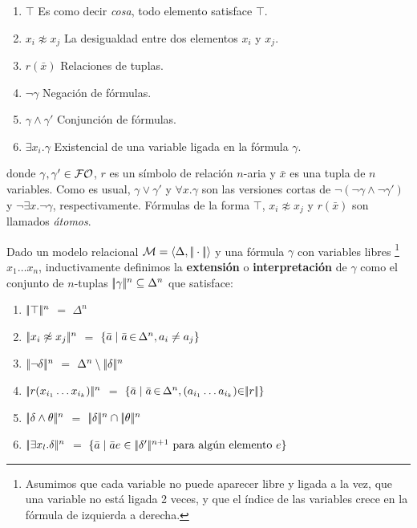 \begin{enumerate}
  \item $\top$ Es como decir {\it cosa}, todo elemento satisface $\top$.
  \item $x_i \not\approx x_j$ La desigualdad entre dos elementos $x_i$ y $x_j$.
  \item $r (\bar x)$ Relaciones de tuplas.
  \item $\lnot \gamma$ Negaci\'on de f\'ormulas.
  \item $\gamma \land \gamma'$ Conjunci\'on de f\'ormulas.
  \item $\exists x_i . \gamma$ Existencial de una variable ligada en la f\'ormula $\gamma$.
\end{enumerate}
%
donde $\gamma,\gamma' \in \mathcal{FO}$,
$r$ es un s\'imbolo de relaci\'on $n$-aria y $\bar x$ es una tupla de $n$ variables.
Como es usual, $\gamma \lor \gamma'$ y $\forall x . \gamma$ son las versiones cortas de
$\lnot(\lnot\gamma \land \lnot\gamma')$ y $\lnot\exists x . \lnot\gamma$, respectivamente.
F\'ormulas de la forma $\top$, $x_i \not\approx x_j$ y $r(\bar
x)$ son llamados \emph{\'atomos}.%

Dado un modelo relacional $\mathcal{M} = \langle \Delta,|\!|\cdot|\!| \rangle$ y una
f\'ormula $\gamma$ con variables libres%
\footnote{%
    Asumimos que cada variable no puede aparecer libre y ligada a la vez, que una variable no est\'a ligada 2 veces,
    y que el \'indice de las variables crece en la f\'ormula de izquierda a derecha.%
}
$x_1\ldots x_n$, inductivamente definimos la \textbf{extensi\'on} o
\textbf{interpretaci\'on} de $\gamma$ como el conjunto de $n$-tuplas
 $|\!|\gamma|\!|^n \subseteq \Delta^n$ que satisface:

\begin{enumerate}

\item $|\!|\top|\!|^n$ $=$ $\Delta^n$

\item $|\!|x_i \not\approx x_j|\!|^n$ $=$ $\{\bar{a} \mid \bar{a} \,{\in}\, \Delta^n, a_i \neq a_j\}$

\item $|\!|\lnot\delta|\!|^n$ $=$ $\Delta^n \setminus |\!|\delta|\!|^n$

\item $|\!|r (x_{i_1} \ldots x_{i_k})|\!|^n$ $=$ $\{\bar{a} \mid \bar{a} \,{\in}\, \Delta^n, (a_{i_1} \ldots a_{i_k}) {\in} |\!|r|\!|\}$

\item $|\!|\delta \land \theta|\!|^n$ $=$ $|\!|\delta|\!|^n \cap |\!|\theta|\!|^n$

\item $|\!|\exists x_{l}.\delta|\!|^n$ $=$ $\{\bar a \mid \bar a  e  \in |\!|\delta'|\!|^{n+1}\ \text{para alg\'un elemento $e$}\}$

\end{enumerate}

